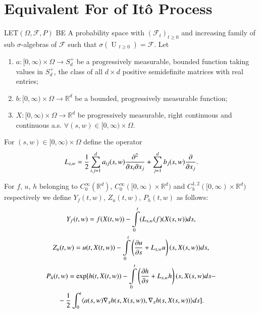 \chapter{Equivalent For of It\^o Process}\label{chap15}

LET\pageoriginale $(\Omega,\mathscr{F},P)$ BE A probability space with
$(\mathscr{F}_{t})_{t\geq 0}$ and increasing family of sub
$\sigma$-algebras of $\mathscr{F}$ such that
$\sigma({\displaystyle{\mathop{U\ \mathscr{F}_{t}}_{t\geq
      0}}})=\mathscr{F}$. Let

\begin{enumerate}
\renewcommand{\theenumi}{\roman{enumi}}
\renewcommand{\labelenumi}{(\theenumi)}
\item $a:[0,\infty)\times \Omega\to S^{+}_{d}$ be a progressively
  measurable, bounded function taking values in $S^{+}_{d}$, the class
  of all $d\times d$ positive semidefinite matrices with real entries;

\item $b:[0,\infty)\times\Omega\to \mathbb{R}^{d}$ be a bounded,
  progressively measurable function;

\item $X:[0,\infty)\times \Omega\to \mathbb{R}^{d}$ be progressively
  measurable, right continuous and continuous a.s. $\forall (s,w)\in
  [0,\infty)\times \Omega$.
\end{enumerate}

For $(s,w)\in [0,\infty)\times \Omega$ define the operator
$$
L_{s,w}=\frac{1}{2}\sum\limits^{d}_{i,j=1}a_{ij}(s,w)\frac{\partial^{2}}{\partial
  x_{i}\partial x_{j}}+\sum\limits^{d}_{j=1}b_{j}(s,w)\frac{\partial}{\partial x_{j}}.
$$

For $f$, $u$, $h$ belonging to $C^{\infty}_{0}(\mathbb{R}^{d})$,
$C^{\infty}_{0}([0,\infty)\times \mathbb{R}^{d})$ and
  $C^{1,2}_{b}([0,\infty)\times \mathbb{R}^{d})$ respectively we
    define $Y_{f}(t,w)$, $Z_{u}(t,w)$, $P_{h}(t,w)$ as follows:
\begin{gather*}
Y_{f}(t,w)=f(X(t,w))-\int\limits^{t}_{0}(L_{s,w}(f)(X(s,w))ds,\\
Z_{u}(t,w)=u(t,X(t,w))-\int\limits^{t}_{0}\left(\frac{\partial u}{\partial
  s}+L_{s,w}u\right)(s,X(s,w))ds,\\
P_{h}(t,w)=\exp[h(t,X(t,w))-\int\limits^{t}_{0}\left(\frac{\partial h}{\partial
    s}+L_{s,w}h\right)(s,X(s,w)ds-\\
{}-\frac{1}{2}\int^{t}_{0}\langle
a(s,w)\nabla_{x}h(s,X(s,w)),\nabla_{x}h(s,X(s,w))\rangle ds].  
\end{gather*}

